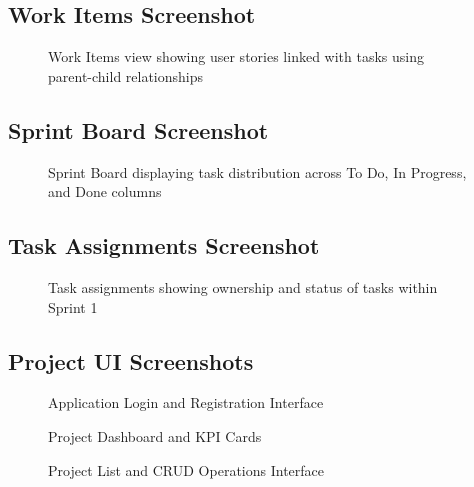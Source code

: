 \documentclass[12pt,a4paper]{article}
\begin{document}
\subsection{Work Items Screenshot}
\begin{figure}[H]
\centering
{}
\caption{Work Items view showing user stories linked with tasks using parent-child relationships}
\end{figure}

\subsection{Sprint Board Screenshot}
\begin{figure}[H]
\centering
{}
\caption{Sprint Board displaying task distribution across To Do, In Progress, and Done columns}
\end{figure}

\subsection{Task Assignments Screenshot}
\begin{figure}[H]
\centering
{}
\caption{Task assignments showing ownership and status of tasks within Sprint 1}
\end{figure}

\subsection{Project UI Screenshots}
\begin{figure}[H]
\centering
{}
\caption{Application Login and Registration Interface}
\end{figure}

\begin{figure}[H]
\centering
{}
\caption{Project Dashboard and KPI Cards}
\end{figure}
\begin{figure}[H]
\centering
{}
\caption{Project List and CRUD Operations Interface}
\end{figure}
\end{document}
